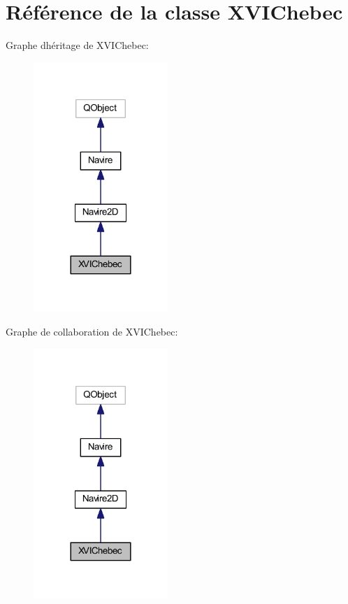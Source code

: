 \hypertarget{class_x_v_i_chebec}{}\section{Référence de la classe X\+V\+I\+Chebec}
\label{class_x_v_i_chebec}


Graphe d\textquotesingle{}héritage de X\+V\+I\+Chebec\+:
\nopagebreak
\begin{figure}[H]
\begin{center}
\leavevmode
\includegraphics[width=144pt]{class_x_v_i_chebec__inherit__graph}
\end{center}
\end{figure}


Graphe de collaboration de X\+V\+I\+Chebec\+:
\nopagebreak
\begin{figure}[H]
\begin{center}
\leavevmode
\includegraphics[width=144pt]{class_x_v_i_chebec__coll__graph}
\end{center}
\end{figure}
